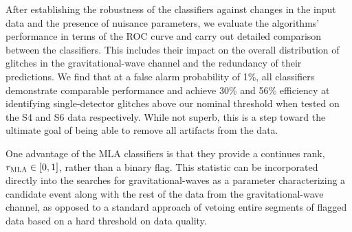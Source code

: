 \documentclass[prd, twocolumn, lengthcheck, superscriptaddress, showpacs, letterpaper, nofootinbib]{revtex4-1}
\newcommand\MLArank{r_{\textsc{MLA}}}
\begin{document}


After establishing the robustness of the classifiers against changes in the
input data and the presence of nuisance parameters, we evaluate the algorithms'
performance in terms of the \ac{ROC} curve and carry out detailed comparison
between the classifiers. This includes their impact on the overall distribution
of glitches in the gravitational-wave channel and the redundancy of their
predictions. We find that at a false alarm probability of 1\%, all classifiers
demonstrate comparable performance and achieve 30\% and 56\% efficiency at
identifying single-detector glitches above our nominal threshold when tested on
the S4 and S6 data respectively. While not superb, this is a step toward the
ultimate goal of being able to remove all artifacts from the data. 

One advantage of the \ac{MLA} classifiers is that they provide a continues
rank, $\MLArank \in [0,1]$, rather than a binary flag. This statistic can be
incorporated directly into the searches for gravitational-waves as a parameter
characterizing a candidate event along with the rest of the data from the
gravitational-wave channel, as opposed to a standard approach of vetoing entire
segments of flagged data based on a hard threshold on data quality.
\end{document}
